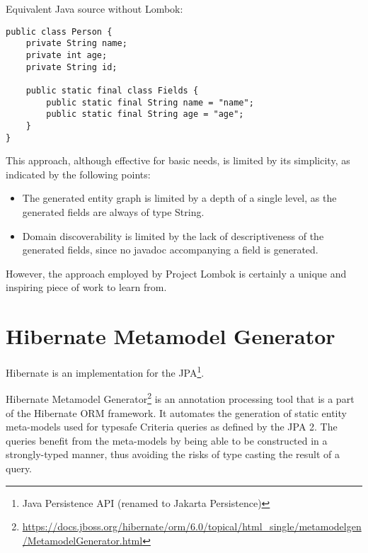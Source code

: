 Equivalent Java source without Lombok:
\begin{verbatim}
public class Person {
    private String name;
    private int age;
    private String id;

    public static final class Fields {
        public static final String name = "name";
        public static final String age = "age";
    }
}
\end{verbatim}

This approach, although effective for basic needs, is limited by its simplicity, as indicated by the following points:
\begin{itemize}
    \item The generated entity graph is limited by a depth of a single level, as the generated fields are always of type String.
    \item Domain discoverability is limited by the lack of descriptiveness of the generated fields, since no javadoc accompanying a field is generated.
\end{itemize}

However, the approach employed by Project Lombok is certainly a unique and inspiring piece of work to learn from.

\section{Hibernate Metamodel Generator}

Hibernate is an implementation for the JPA\footnote{Java Persistence API (renamed to Jakarta Persistence)}.

\n

Hibernate Metamodel Generator\footnote{\url{https://docs.jboss.org/hibernate/orm/6.0/topical/html\_single/metamodelgen/MetamodelGenerator.html}} is an annotation processing tool that is a part of the Hibernate ORM framework. It automates the generation of static entity meta-models used for typesafe Criteria queries as defined by the JPA 2. The queries benefit from the meta-models by being able to be constructed in a strongly-typed manner, thus avoiding the risks of type casting the result of a query.


